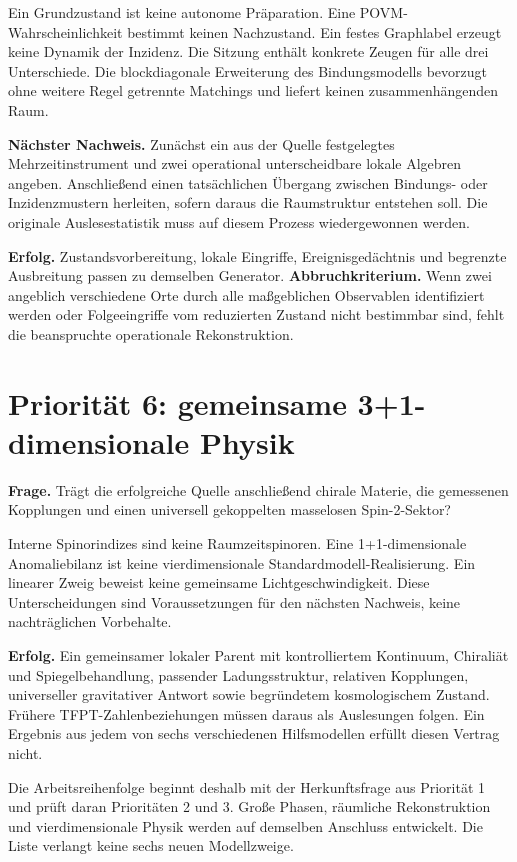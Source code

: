 \documentclass[11pt,a4paper,oneside,parskip=half,headings=normal,numbers=noenddot,bibliography=totoc]{scrreprt}
\begin{document}
Ein Grundzustand ist keine autonome Präparation. Eine POVM-Wahrscheinlichkeit bestimmt keinen Nachzustand. Ein festes Graphlabel erzeugt keine Dynamik der Inzidenz. Die Sitzung enthält konkrete Zeugen für alle drei Unterschiede. Die blockdiagonale Erweiterung des Bindungsmodells bevorzugt ohne weitere Regel getrennte Matchings und liefert keinen zusammenhängenden Raum.

\textbf{Nächster Nachweis.} Zunächst ein aus der Quelle festgelegtes Mehrzeitinstrument und zwei operational unterscheidbare lokale Algebren angeben. Anschließend einen tatsächlichen Übergang zwischen Bindungs- oder Inzidenzmustern herleiten, sofern daraus die Raumstruktur entstehen soll. Die originale Auslesestatistik muss auf diesem Prozess wiedergewonnen werden.

\textbf{Erfolg.} Zustandsvorbereitung, lokale Eingriffe, Ereignisgedächtnis und begrenzte Ausbreitung passen zu demselben Generator. \textbf{Abbruchkriterium.} Wenn zwei angeblich verschiedene Orte durch alle maßgeblichen Observablen identifiziert werden oder Folgeeingriffe vom reduzierten Zustand nicht bestimmbar sind, fehlt die beanspruchte operationale Rekonstruktion.

\section{Priorität 6: gemeinsame 3+1-dimensionale Physik}
\textbf{Frage.} Trägt die erfolgreiche Quelle anschließend chirale Materie, die gemessenen Kopplungen und einen universell gekoppelten masselosen Spin-2-Sektor?

Interne Spinorindizes sind keine Raumzeitspinoren. Eine 1+1-dimensionale Anomaliebilanz ist keine vierdimensionale Standardmodell-Realisierung. Ein linearer Zweig beweist keine gemeinsame Lichtgeschwindigkeit. Diese Unterscheidungen sind Voraussetzungen für den nächsten Nachweis, keine nachträglichen Vorbehalte.

\textbf{Erfolg.} Ein gemeinsamer lokaler Parent mit kontrolliertem Kontinuum, Chiraliät und Spiegelbehandlung, passender Ladungsstruktur, relativen Kopplungen, universeller gravitativer Antwort sowie begründetem kosmologischem Zustand. Frühere TFPT-Zahlenbeziehungen müssen daraus als Auslesungen folgen. Ein Ergebnis aus jedem von sechs verschiedenen Hilfsmodellen erfüllt diesen Vertrag nicht.

Die Arbeitsreihenfolge beginnt deshalb mit der Herkunftsfrage aus Priorität 1 und prüft daran Prioritäten 2 und 3. Große Phasen, räumliche Rekonstruktion und vierdimensionale Physik werden auf demselben Anschluss entwickelt. Die Liste verlangt keine sechs neuen Modellzweige.
\end{document}
